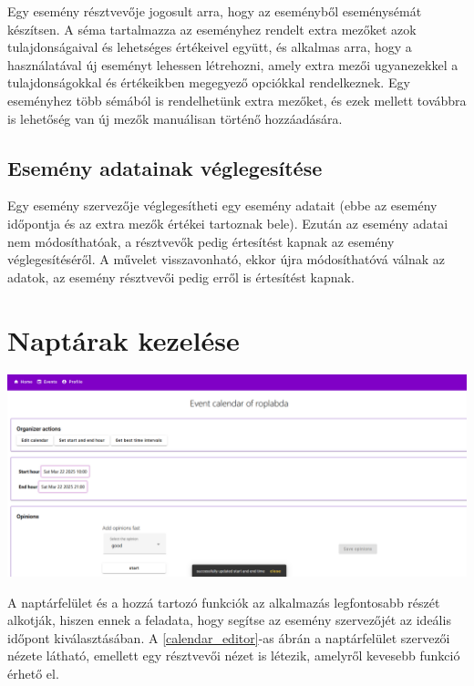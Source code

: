 \documentclass[a4paper,12pt]{report}
\theoremstyle{definition}
\theoremstyle{remark}
\begin{document}
Egy esemény résztvevője jogosult arra, hogy az eseményből eseménysémát készítsen. A séma tartalmazza az eseményhez rendelt extra mezőket azok tulajdonságaival és lehetséges értékeivel együtt, és alkalmas arra, hogy a használatával új eseményt lehessen létrehozni, amely extra mezői ugyanezekkel a tulajdonságokkal és értékeikben megegyező opciókkal rendelkeznek. Egy eseményhez több sémából is rendelhetünk extra mezőket, és ezek mellett továbbra is lehetőség van új mezők manuálisan történő hozzáadására.

	\subsection{Esemény adatainak véglegesítése}

Egy esemény szervezője véglegesítheti egy esemény adatait (ebbe az esemény időpontja és az extra mezők értékei tartoznak bele).  Ezután az esemény adatai nem módosíthatóak, a résztvevők pedig értesítést kapnak az esemény véglegesítéséről. A művelet visszavonható, ekkor újra módosíthatóvá válnak az adatok, az esemény résztvevői pedig erről is értesítést kapnak.

\section{Naptárak kezelése}

\begin{center}
\includegraphics[width=150mm]{calendar_editor}
\captionsetup{width=0.8\linewidth}
\label{calendar_editor}
\end{center}

A naptárfelület és a hozzá tartozó funkciók az alkalmazás legfontosabb részét alkotják, hiszen ennek a feladata, hogy segítse az esemény szervezőjét az ideális időpont kiválasztásában. A \ref{calendar_editor}-as ábrán a naptárfelület szervezői nézete látható, emellett egy résztvevői nézet is létezik, amelyről kevesebb funkció érhető el.
\end{document}
